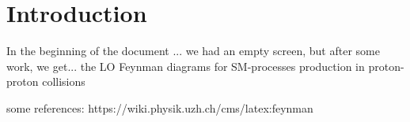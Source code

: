 \section{Introduction} %

\label{SectionIntro} %

In the beginning of the document ... we had an empty screen, but after some work, we get... the LO Feynman diagrams for SM-processes production in proton-proton collisions 

some references: https://wiki.physik.uzh.ch/cms/latex:feynman

